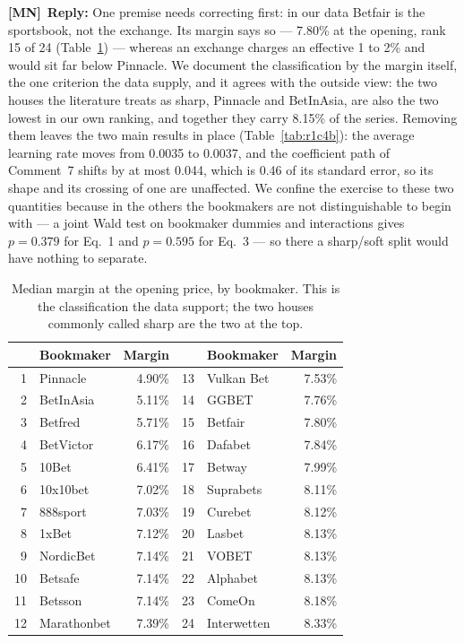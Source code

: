 \documentclass[letterpaper,12pt]{article}
\newcounter{b}
\newcommand{\ReplyMN}[1]{\par\noindent%
  \textcolor{mncol}{\textbf{[MN]}}~\textbf{Reply:} #1}
\begin{document}
\begin{enumerate}
\ReplyMN{One premise needs correcting first: in our data Betfair is the sportsbook, not the exchange. Its margin says so --- 7.80\% at the opening, rank 15 of 24 (Table~\ref{tab:r1c4}) --- whereas an exchange charges an effective 1 to 2\% and would sit far below Pinnacle. We document the classification by the margin itself, the one criterion the data supply, and it agrees with the outside view: the two houses the literature treats as sharp, Pinnacle and BetInAsia, are also the two lowest in our own ranking, and together they carry 8.15\% of the series. Removing them leaves the two main results in place (Table~\ref{tab:r1c4b}): the average learning rate moves from 0.0035 to 0.0037, and the coefficient path of Comment~7 shifts by at most 0.044, which is 0.46 of its standard error, so its shape and its crossing of one are unaffected. We confine the exercise to these two quantities because in the others the bookmakers are not distinguishable to begin with --- a joint Wald test on bookmaker dummies and interactions gives $p = 0.379$ for Eq.~1 and $p = 0.595$ for Eq.~3 --- so there a sharp/soft split would have nothing to separate.

\begin{table}[H]
\centering
\caption{Median margin at the opening price, by bookmaker. This is the classification the data support; the two houses commonly called sharp are the two at the top.}
\label{tab:r1c4}
\small
\begin{tabular}{rlr@{\qquad\qquad}rlr}
\toprule
 & Bookmaker & Margin & & Bookmaker & Margin \\
\midrule
1  & Pinnacle    & 4.90\% & 13 & Vulkan Bet  & 7.53\% \\
2  & BetInAsia   & 5.11\% & 14 & GGBET       & 7.76\% \\
3  & Betfred     & 5.71\% & 15 & Betfair     & 7.80\% \\
4  & BetVictor   & 6.17\% & 16 & Dafabet     & 7.84\% \\
5  & 10Bet       & 6.41\% & 17 & Betway      & 7.99\% \\
6  & 10x10bet    & 7.02\% & 18 & Suprabets   & 8.11\% \\
7  & 888sport    & 7.03\% & 19 & Curebet     & 8.12\% \\
8  & 1xBet       & 7.12\% & 20 & Lasbet      & 8.13\% \\
9  & NordicBet   & 7.14\% & 21 & VOBET       & 8.13\% \\
10 & Betsafe     & 7.14\% & 22 & Alphabet    & 8.13\% \\
11 & Betsson     & 7.14\% & 23 & ComeOn      & 8.18\% \\
12 & Marathonbet & 7.39\% & 24 & Interwetten & 8.33\% \\
\bottomrule
\end{tabular}
\end{table}

}
\end{enumerate}
\end{document}
